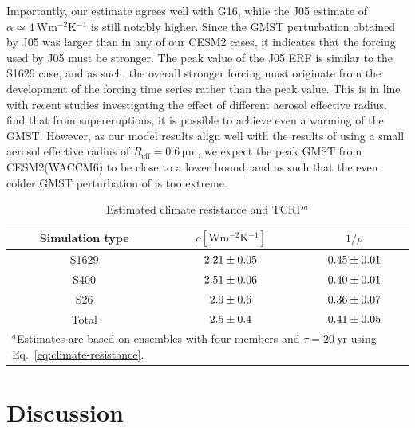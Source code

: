 \documentclass[draft]{agujournal2019}
\begin{document}
  Importantly, our estimate agrees well with G16, while the J05 estimate of \(\alpha
  \simeq \SI{4}{\watt\metre^{-2}\kelvin^{-1}}\) is still notably higher. Since the GMST
  perturbation obtained by J05 was larger than in any of our CESM2 cases, it indicates
  that the forcing used by J05 must be stronger.  The peak value
  of the J05 ERF is similar to the S1629 case, and as such, the overall stronger forcing
  must originate from the development of the forcing time series rather than the peak
  value. This is in line with recent studies investigating the effect of different
  aerosol effective radius.  find that from supereruptions, it is
  possible to achieve even a warming of the GMST. However, as our model results align
  well with the results of  using a small aerosol effective radius of
  \(R_{\mathrm{eff}}=\SI{0.6}{\micro\meter}\), we expect the peak GMST from
  CESM2(WACCM6) to be close to a lower bound, and as such that the even colder GMST
  perturbation of  is too extreme.

  \begin{table}
    \centering

    \caption{Estimated climate resistance and TCRP\(^{a}\)}\label{tab:trcp}%
    \begin{tabular}{ccc}
      \toprule
      Simulation type & \(\rho [\si{\watt\metre^{-2}\kelvin^{-1}}]\) & \(1/\rho\) \\
      \midrule
      S1629 & \(\num{2.21\pm0.05}\) & \(\num{0.45\pm0.01}\) \\
      S400 & \(\num{2.51\pm0.06}\) & \(\num{0.40\pm0.01}\) \\
      S26 & \(\num{2.9\pm0.6}\) & \(\num{0.36\pm0.07}\) \\
      Total & \(\num{2.5\pm0.4}\) & \(\num{0.41\pm0.05}\) \\
      \toprule
      \multicolumn{3}{l}{\parbox{0.5\linewidth}{\(^{a}\)Estimates are based on ensembles with four members and \(\tau
          =\SI{20}{\mathrm{yr}}\) using Eq.~\ref{eq:climate-resistance}.}} \\
    \end{tabular}
  \end{table}

  \section{Discussion}

  \label{sec:discussion}
\end{document}
